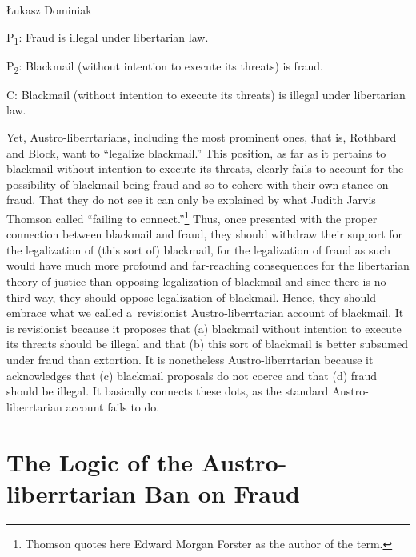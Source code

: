 \begin{artengenv}{Łukasz Dominiak}
\medskip

\noindent P\textsubscript{1}: Fraud is illegal under libertarian law.



\noindent P\textsubscript{2}: Blackmail (without intention to execute its threats) is fraud.



\noindent C: Blackmail (without intention to execute its threats) is illegal under libertarian law.

\medskip

Yet, Austro-liberrtarians, including the most prominent ones, that is, Rothbard and Block, want to ``legalize blackmail.'' 
\parencite[see][]{block_legalize_2013} %
 This position, as far as it pertains to blackmail without intention to execute its threats, clearly fails to account for the possibility of blackmail being fraud and so to cohere with their own stance on fraud. That they do not see it can only be explained by what Judith Jarvis Thomson 
\parencite*[][pp.25–33]{thomson_realm_1990} %
 called ``failing to connect.''\footnote{Thomson quotes here Edward Morgan Forster 
\parencite*[][]{forster_howards_1941} %
 as the author of the term.} Thus, once presented with the proper connection between blackmail and fraud, they should withdraw their support for the legalization of (this sort of) blackmail, for the legalization of fraud as such would have much more profound and far-reaching consequences for the libertarian theory of justice than opposing legalization of blackmail and since there is no third way, they should oppose legalization of blackmail. Hence, they should embrace what we called a~revisionist Austro-liberrtarian account of blackmail. It is revisionist because it proposes that (a) blackmail without intention to execute its threats should be illegal and that (b) this sort of blackmail is better subsumed under fraud than extortion. It is nonetheless Austro-liberrtarian because it acknowledges that (c) blackmail proposals do not coerce and that (d) fraud should be illegal. It basically connects these dots, as the standard Austro-liberrtarian account fails to do.



\section{The Logic of the Austro-liberrtarian Ban on Fraud}


\end{artengenv}
